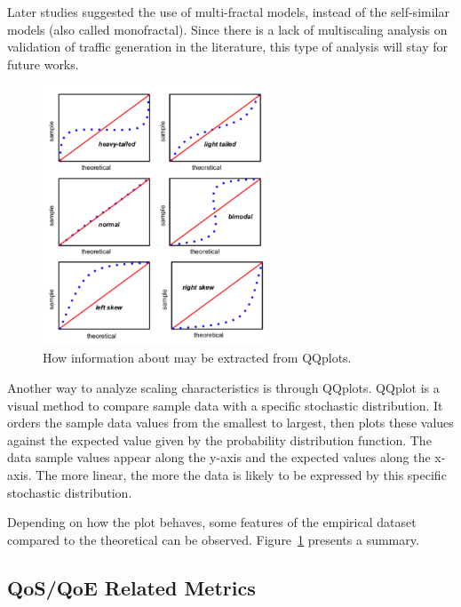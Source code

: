 Later studies suggested the use of multi-fractal models, instead of the self-similar models (also called monofractal)\cite{validate-trafficgen}\cite{udp-flows-model}. Since there is a lack of multiscaling analysis on validation of traffic generation in the literature, this type of analysis will stay for future works.

\begin{figure}[ht!]
	\centering
	\includegraphics[width=0.6\textwidth]{figures/ch2/qqplot-tutorial}
	\caption{ How information about may be extracted from QQplots.}
	\label{fig:qqplot-tutorial}
\end{figure}


Another way to analyze scaling characteristics is through QQplots. \acrshort{QQplot} is a visual method to compare sample data with a specific stochastic distribution. It orders the sample data values from the smallest to largest, then plots these values against the expected value given by the probability distribution function. The data sample values appear along the y-axis and the expected values along the x-axis. The more linear, the more the data is likely to be expressed by this specific stochastic distribution. 

Depending on how the plot behaves, some features of the empirical dataset compared to the theoretical can be observed. Figure~\ref{fig:qqplot-tutorial} presents a summary.


\subsection{QoS/QoE Related Metrics}


